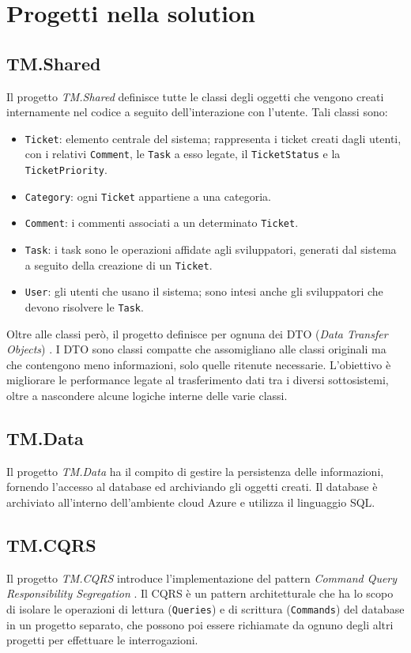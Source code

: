\section{Progetti nella solution}

\subsection{TM.Shared}
Il progetto \textit{TM.Shared} definisce tutte le classi degli oggetti che vengono creati internamente nel codice a seguito dell'interazione
con l'utente. Tali classi sono:
\begin{itemize}
    \item \texttt{Ticket}: elemento centrale del sistema; rappresenta i ticket creati dagli utenti, con i relativi \texttt{Comment},
        le \texttt{Task} a esso legate, il \texttt{TicketStatus} e la \texttt{TicketPriority}.
    \item \texttt{Category}: ogni \texttt{Ticket} appartiene a una categoria.
    \item \texttt{Comment}: i commenti associati a un determinato \texttt{Ticket}.
    \item \texttt{Task}: i task sono le operazioni affidate agli sviluppatori, generati dal sistema a seguito della creazione
        di un \texttt{Ticket}.
    \item \texttt{User}: gli utenti che usano il sistema; sono intesi anche gli sviluppatori che devono risolvere le \texttt{Task}.
\end{itemize}
Oltre alle classi però, il progetto definisce per ognuna dei DTO (\textit{Data Transfer Objects}) \cite{microsoft_webapi_ef_part5}.
I DTO sono classi compatte che assomigliano alle classi originali ma che contengono meno informazioni, solo quelle ritenute necessarie.
L'obiettivo è migliorare le performance legate al trasferimento dati tra i diversi sottosistemi, oltre a nascondere alcune logiche interne delle varie classi.

\subsection{TM.Data}
Il progetto \textit{TM.Data} ha il compito di gestire la persistenza delle informazioni, fornendo l'accesso al database
ed archiviando gli oggetti creati. Il database è archiviato all'interno dell'ambiente cloud Azure e utilizza il linguaggio SQL.

\subsection{TM.CQRS}
Il progetto \textit{TM.CQRS} introduce l'implementazione del pattern \textit{Command Query Responsibility Segregation} \cite{azure_cqrs_msdocs}.
Il CQRS è un pattern architetturale che ha lo scopo di isolare le operazioni di lettura (\texttt{Queries}) e di scrittura (\texttt{Commands})
del database in un progetto separato, che possono poi essere richiamate da ognuno degli altri progetti per effettuare le interrogazioni.

